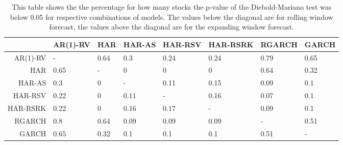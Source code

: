 \begin{table}[ht]
\centering
\begin{tabular}{rlllllll}
  \hline
 & AR(1)-RV & HAR & HAR-AS & HAR-RSV & HAR-RSRK & RGARCH & GARCH \\ 
  \hline
AR(1)-RV & - & 0.64 & 0.3 & 0.24 & 0.24 & 0.79 & 0.65 \\ 
  HAR & 0.65 & - & 0 & 0 & 0 & 0.64 & 0.32 \\ 
  HAR-AS & 0.3 & 0 & - & 0.11 & 0.15 & 0.09 & 0.1 \\ 
  HAR-RSV & 0.22 & 0 & 0.11 & - & 0.16 & 0.07 & 0.1 \\ 
  HAR-RSRK & 0.22 & 0 & 0.16 & 0.17 & - & 0.09 & 0.1 \\ 
  RGARCH & 0.8 & 0.64 & 0.09 & 0.09 & 0.09 & - & 0.51 \\ 
  GARCH & 0.65 & 0.32 & 0.1 & 0.1 & 0.1 & 0.51 & - \\ 
   \hline
\end{tabular}
\caption[DM test below 0.05]{This table shows the the percentage for how many stocks the p-value of the Diebold-Mariano test was below 0.05 for respective combinations of models.
                The values below the diagonal are for rolling window forecast, the values above the diagonal are for the expanding window forecast.} 
\label{Table:DM_test_threshold}
\end{table}

